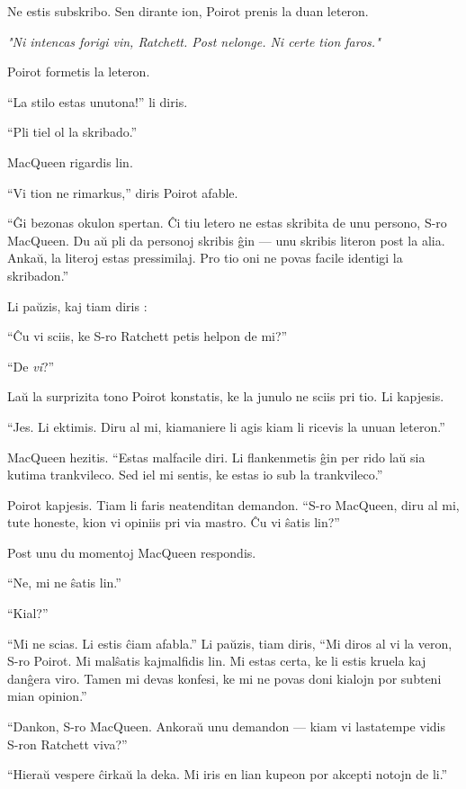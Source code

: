 Ne estis subskribo. Sen dirante ion, Poirot prenis la duan leteron.

\begin{center}\itshape "Ni intencas forigi vin, Ratchett. Post nelonge. Ni certe tion faros."\end{center}

Poirot formetis la leteron.

``La stilo estas unutona!'' li diris.

``Pli tiel ol la skribado.''

MacQueen rigardis lin.

``Vi tion ne rimarkus,'' diris Poirot afable.

``Ĝi bezonas okulon spertan. Ĉi tiu letero ne estas skribita de unu persono, S-ro MacQueen. Du aŭ pli da personoj skribis ĝin --- unu skribis literon post la alia. Ankaŭ, la literoj estas pressimilaj. Pro tio oni ne povas facile identigi la skribadon.''

Li paŭzis, kaj tiam diris :

``Ĉu vi sciis, ke S-ro Ratchett petis helpon de mi?''

``De \emph{vi}?''

Laŭ la surprizita tono Poirot konstatis, ke la junulo ne sciis pri tio. Li kapjesis.

``Jes. Li ektimis. Diru al mi, kiamaniere li agis kiam li ricevis la unuan leteron.''

MacQueen hezitis. ``Estas malfacile diri. Li flankenmetis ĝin per rido laŭ sia kutima trankvileco. Sed iel mi sentis, ke estas io sub la trankvileco.''

Poirot kapjesis. Tiam li faris neatenditan demandon. ``S-ro MacQueen, diru al mi, tute honeste, kion vi opiniis pri via mastro. Ĉu vi ŝatis lin?''

Post unu du momentoj MacQueen respondis.

``Ne, mi ne ŝatis lin.''

``Kial?''

``Mi ne scias. Li estis ĉiam afabla.'' Li paŭzis, tiam diris, ``Mi diros al vi la veron, S-ro Poirot. Mi malŝatis kajmalfidis lin. Mi estas certa, ke li estis kruela kaj danĝera viro. Tamen mi devas konfesi, ke mi ne povas doni kialojn por subteni mian opinion.''

``Dankon, S-ro MacQueen. Ankoraŭ unu demandon --- kiam vi lastatempe vidis S-ron Ratchett viva?''

``Hieraŭ vespere ĉirkaŭ la deka. Mi iris en lian kupeon por akcepti notojn de li.''

